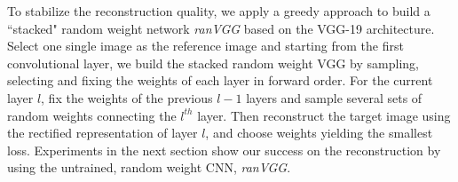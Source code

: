\documentclass{article}
\begin{document}
To stabilize the reconstruction quality, we apply a greedy approach to build a ``stacked" random weight network \emph{ranVGG} based on the VGG-19 architecture.
Select one single image as the reference image and starting from the first convolutional layer,
we build the stacked random weight VGG by sampling, selecting and fixing the weights of each layer in forward order.
For the current layer $l$, fix the weights of the previous $l-1$ layers and sample several sets of random weights connecting the $l^{th}$ layer. Then reconstruct the target image using the rectified representation of layer $l$, and choose weights yielding the smallest loss.
Experiments in the next section show our success on the reconstruction by using the untrained, random weight CNN, \emph{ranVGG}.


\end{document}
